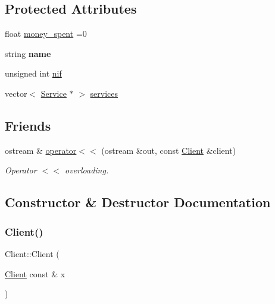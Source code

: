 \subsection*{Protected Attributes}
\begin{DoxyCompactItemize}
\item 
float \hyperlink{class_client_a9d5dc70a6eee2fded8217a7983fe5fd0}{money\+\_\+spent} =0
\item 
\mbox{\label{class_client_a456e36f9972a8bf3ecdb5f0e70b3bd5d}} 
string {\bfseries name}
\item 
unsigned int \hyperlink{class_client_a1c94dc96a56cb5032573fb1d528517c2}{nif}
\item 
vector$<$ \hyperlink{class_service}{Service} $\ast$ $>$ \hyperlink{class_client_a02b601f12b9905edae7e64ded9bde912}{services}
\end{DoxyCompactItemize}
\subsection*{Friends}
\begin{DoxyCompactItemize}
\item 
ostream \& \hyperlink{class_client_a001b1071dc56da194d697f845bbc4b1b}{operator$<$$<$} (ostream \&out, const \hyperlink{class_client}{Client} \&client)
\begin{DoxyCompactList}\small\item\em Operator $<$$<$ overloading. \end{DoxyCompactList}\end{DoxyCompactItemize}


\subsection{Constructor \& Destructor Documentation}
\mbox{\label{class_client_ab3079953a67493b5da6ffb32d4f14ac7}} 
\subsubsection{\texorpdfstring{Client()}{Client()}\hspace{0.1cm}{\footnotesize\ttfamily [1/3]}}
{\footnotesize\ttfamily Client\+::\+Client (\begin{DoxyParamCaption}\item[{\hyperlink{class_client}{Client} const \&}]{x }\end{DoxyParamCaption})}

